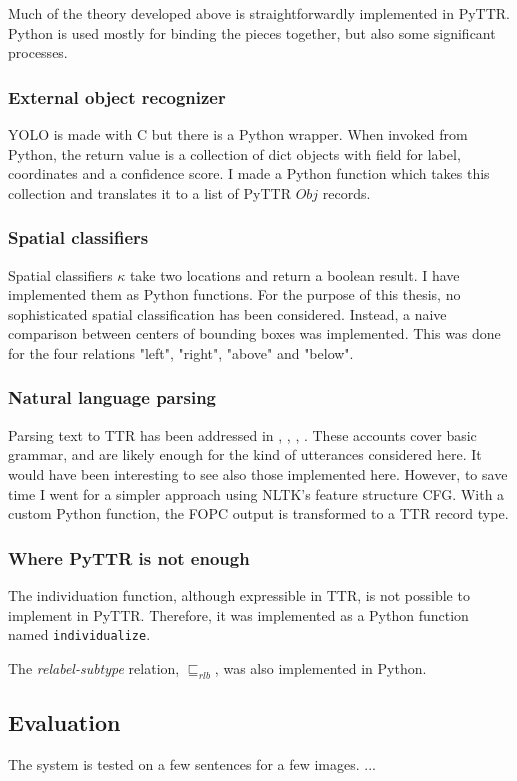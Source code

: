 Much of the theory developed above is straightforwardly implemented in PyTTR.
Python is used mostly for binding the pieces together, but also some significant processes.



\subsubsection{External object recognizer}

YOLO \citep{yolo} is made with C but there is a Python wrapper.
When invoked from Python, the return value is a collection of dict objects with field for label, coordinates and a confidence score.
I made a Python function which takes this collection and translates it to a list of PyTTR $Obj$ records.



\subsubsection{Spatial classifiers}

Spatial classifiers $\kappa$ take two locations and return a boolean result.
I have implemented them as Python functions.
For the purpose of this thesis, no sophisticated spatial classification has been considered.
Instead, a naive comparison between centers of bounding boxes was implemented.
This was done for the four relations "left", "right", "above" and "below".



\subsubsection{Natural language parsing}

Parsing text to TTR has been addressed in \cite{CooperRecordsRecordTypes2005}, \cite{RobinCooperAustiniantruthattitudes2005}, \cite{CooperTypetheorysemantics2012}, \cite{CooperTypetheorylanguage2016}.
These accounts cover basic grammar, and are likely enough for the kind of utterances considered here.
It would have been interesting to see also those implemented here.
However, to save time I went for a simpler approach using NLTK's feature structure CFG.
With a custom Python function, the FOPC output is transformed to a TTR record type.



\subsubsection{Where PyTTR is not enough}

The individuation function, although expressible in TTR, is not possible to implement in PyTTR.
Therefore, it was implemented as a Python function named {\tt individualize}.

The \textit{relabel-subtype} relation, $\sqsubseteq_{rlb}$, was also implemented in Python.



\subsection{Evaluation}

The system is tested on a few sentences for a few images.
...
